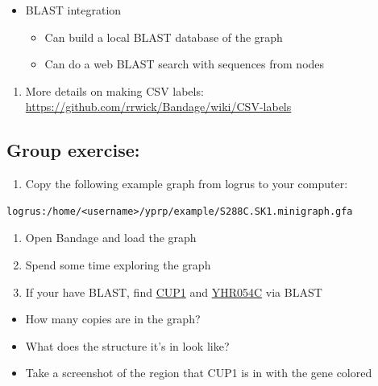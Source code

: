 \documentclass[
]{book}
\providecommand{\tightlist}{%
  \setlength{\itemsep}{0pt}\setlength{\parskip}{0pt}}
\begin{document}
\begin{itemize}
\tightlist
\item
  BLAST integration

  \begin{itemize}
  \tightlist
  \item
    Can build a local BLAST database of the graph
  \item
    Can do a web BLAST search with sequences from nodes
  \end{itemize}
\end{itemize}

\begin{enumerate}
\def\labelenumi{\arabic{enumi}.}
\setcounter{enumi}{1}
\tightlist
\item
  More details on making CSV labels: \url{https://github.com/rrwick/Bandage/wiki/CSV-labels}
\end{enumerate}

\hypertarget{group-exercise}{%
\subsection*{\texorpdfstring{\textbf{Group exercise:}}{Group exercise:}}\label{group-exercise}}

\begin{enumerate}
\def\labelenumi{\arabic{enumi}.}
\tightlist
\item
  Copy the following example graph from logrus to your computer:
\end{enumerate}

\begin{verbatim}
logrus:/home/<username>/yprp/example/S288C.SK1.minigraph.gfa
\end{verbatim}

\begin{enumerate}
\def\labelenumi{\arabic{enumi}.}
\setcounter{enumi}{1}
\tightlist
\item
  Open Bandage and load the graph
\item
  Spend some time exploring the graph
\item
  If your have BLAST, find \href{https://www.yeastgenome.org/locus/S000001095}{CUP1} and \href{https://www.yeastgenome.org/locus/S000001096}{YHR054C} via BLAST
\end{enumerate}

\begin{itemize}
\tightlist
\item
  How many copies are in the graph?
\item
  What does the structure it's in look like?
\item
  Take a screenshot of the region that CUP1 is in with the gene colored
\end{itemize}
\end{document}
